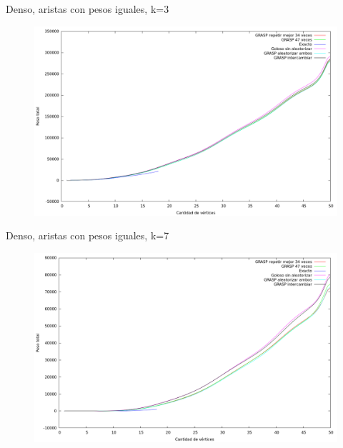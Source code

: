 \vspace*{0.5cm}

Denso, aristas con pesos iguales, k=3
\vspace*{0.5cm}

\begin{figure}[H]
  \begin{center}
    \includegraphics[scale=0.35]{imagenes/ej6-denso-pesos-iguales-k3-peso.png}
  \end{center}
\end{figure}

\vspace*{0.5cm}

Denso, aristas con pesos iguales, k=7
\vspace*{0.5cm}

\begin{figure}[H]
  \begin{center}
    \includegraphics[scale=0.35]{imagenes/ej6-denso-pesos-iguales-k7-peso.png}
  \end{center}
\end{figure}

